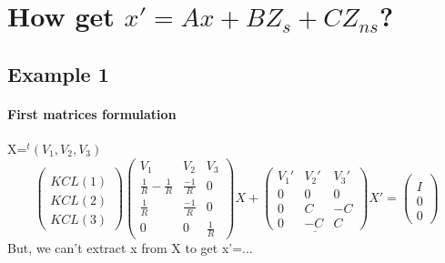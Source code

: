 \documentclass[10pt]{article}
\begin{document}
\newpage
\section{How get $x' = Ax+BZ_{s} + CZ_{ns}$?}
\subsection{Example 1}
\begin{figure}[h]
\centerline{
 \scalebox{0.5}{
    
 }
}
\end{figure}
\paragraph{First matrices formulation}
X=$^{t}(V_{1},V_{2},V_{3})$\\
\[\left(\begin{array}{c}
  \\
  KCL(1)\\  KCL(2)\\  KCL(3)
  \end{array}\right)
\left(\begin{array}{ccc}
  V_{1}&V_{2}&V_{3}\\
  \hline
  \frac{1}{R}-\frac{1}{R}&  \frac{-1}{R}&0\\
  \frac{1}{R}&  \frac{-1}{R}&0\\
  0&0&\frac{1}{R}
\end{array}\right)X+
\underline{
\left(\begin{array}{ccc}
   V_{1}'&V_{2}'&V_{3}'\\
  \hline
0&0&0\\
  0&C&-C\\
  0&-C&C
\end{array}\right)}X'=
\left(\begin{array}{c}
  \\
  I\\
  0\\
  0
  \end{array}\right)
\]
But, we can't extract x from X to get x'=...\\
\newline
\end{document}
